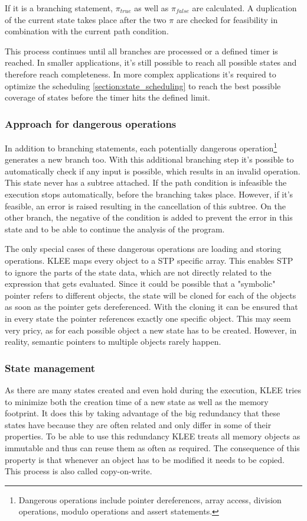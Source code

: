 If it is a branching statement, $\pi_{true}$ as well as $\pi_{false}$ are calculated. A duplication of the current state takes place after the two $\pi$ are checked for feasibility in combination with the current path condition.

This process continues until all branches are processed or a defined timer is reached. In smaller applications, it's still possible to reach all possible states and therefore reach completeness. In more complex applications it's required to optimize the scheduling \ref{section:state_scheduling} to reach the best possible coverage of states before the timer hits the defined limit.
\subsubsection{Approach for dangerous operations}\label{section:dangerous_operations}
In addition to branching statements, each potentially dangerous operation\footnote{Dangerous operations include pointer dereferences, array access, division operations, modulo operations and assert statements.} generates a new branch too. With this additional branching step it's possible to automatically check if any input is possible, which results in an invalid operation. This state never has a subtree attached. If the path condition is infeasible the execution stops automatically, before the branching takes place. However, if it's feasible, an error is raised resulting in the cancellation of this subtree. On the other branch, the negative of the condition is added to prevent the error in this state and to be able to continue the analysis of the program.

The only special cases of these dangerous operations are loading and storing operations. KLEE maps every object to a STP specific array. This enables STP to ignore the parts of the state data, which are not directly related to the expression that gets evaluated. Since it could be possible that a "symbolic" pointer refers to different objects, the state will be cloned for each of the objects as soon as the pointer gets dereferenced. With the cloning it can be ensured that in every state the pointer references exactly one specific object. This may seem very pricy, as for each possible object a new state has to be created. However, in reality, semantic pointers to multiple objects rarely happen. 

\subsubsection{State management}
As there are many states created and even hold during the execution, KLEE tries to minimize both the creation time of a new state as well as the memory footprint. It does this by taking advantage of the big redundancy that these states have because they are often related and only differ in some of their properties. To be able to use this redundancy KLEE treats all memory objects as immutable and thus can reuse them as often as required. The consequence of this property is that whenever an object has to be modified it needs to be copied. This process is also called copy-on-write.

